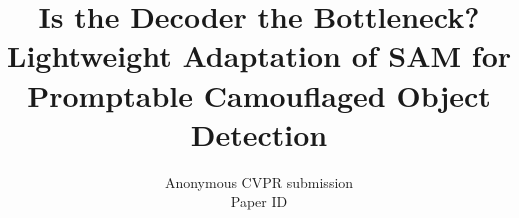 \documentclass[10pt,twocolumn,letterpaper]{article}
\title{Is the Decoder the Bottleneck? Lightweight Adaptation of SAM for Promptable Camouflaged Object Detection}
\author{Anonymous CVPR submission\\Paper ID \paperID}
\begin{document}
\maketitle








{
    \small
    
    
}
\end{document}
